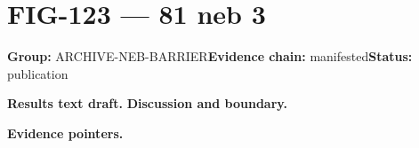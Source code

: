 \clearpage
\section{FIG-123 --- 81 neb 3}
\label{figpage:fig-123}
\textbf{Group:} ARCHIVE-NEB-BARRIER\quad \textbf{Evidence chain:} manifested\quad \textbf{Status:} publication

\textbf{Results text draft.} 
\textbf{Discussion and boundary.} 


\textbf{Evidence pointers.}



\vfill
